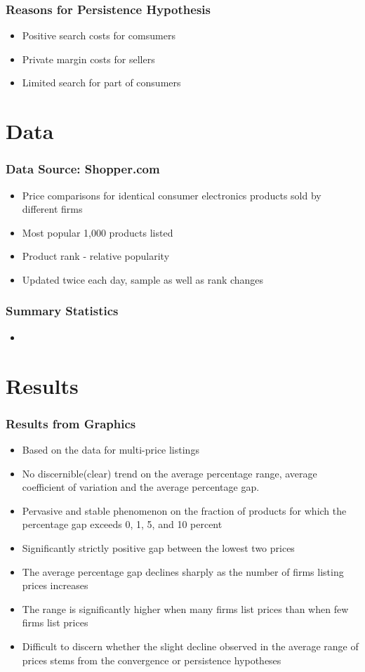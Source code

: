 \documentclass{beamer}
\begin{document}
\begin{frame}
\frametitle{Reasons for Persistence Hypothesis}
\begin{itemize}
\item Positive search costs for comsumers
\item Private margin costs for sellers
\item Limited search for part of consumers
\end{itemize}
\end{frame}

\section{Data}
\begin{frame}
\frametitle{Data Source: Shopper.com}
\begin{itemize}
\item Price comparisons for identical consumer electronics products sold by different firms
\item Most popular 1,000 products listed 
\item Product rank - relative popularity
\item Updated twice each day, sample as well as rank changes
\end{itemize}
\end{frame}

\begin{frame}
\frametitle{Summary Statistics}
\begin{itemize}
\item 
\end{itemize}
\end{frame}

\section{Results}
\begin{frame}[allowframebreaks]
\frametitle{Results from Graphics}
\begin{itemize}
\item Based on the data for multi-price listings
\item No discernible(clear) trend on the average percentage range, average coefficient of variation and the average percentage gap.
\item Pervasive and stable phenomenon on the fraction of products for which the percentage gap exceeds 0, 1, 5, and 10 percent
\item Significantly strictly positive gap between the lowest two prices
\framebreak
\item The average percentage gap declines sharply as the number of firms listing prices increases
\item The range is significantly higher when many firms list prices than when few firms list prices
\item Difficult to discern whether the slight decline observed in the average range of prices stems from the convergence or persistence hypotheses
\end{itemize}
\end{frame}
\end{document}
